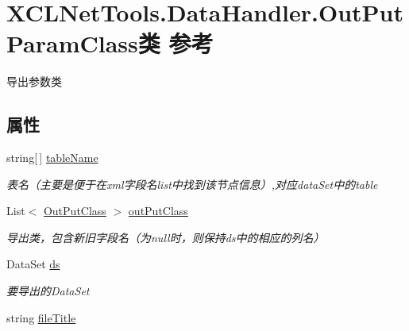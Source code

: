 \hypertarget{class_x_c_l_net_tools_1_1_data_handler_1_1_out_put_param_class}{\section{X\-C\-L\-Net\-Tools.\-Data\-Handler.\-Out\-Put\-Param\-Class类 参考}
\label{class_x_c_l_net_tools_1_1_data_handler_1_1_out_put_param_class}
}


导出参数类  


\subsection*{属性}
\begin{DoxyCompactItemize}
\item 
string\mbox{[}$\,$\mbox{]} \hyperlink{class_x_c_l_net_tools_1_1_data_handler_1_1_out_put_param_class_a7da1f957b459cb7fa6e6adcdbdaec714}{table\-Name}
\begin{DoxyCompactList}\small\item\em 表名（主要是便于在xml字段名list中找到该节点信息）,对应data\-Set中的table \end{DoxyCompactList}\item 
List$<$ \hyperlink{class_x_c_l_net_tools_1_1_data_handler_1_1_out_put_class}{Out\-Put\-Class} $>$ \hyperlink{class_x_c_l_net_tools_1_1_data_handler_1_1_out_put_param_class_a4288510d1df7a0d061c8cc846c3db900}{out\-Put\-Class}
\begin{DoxyCompactList}\small\item\em 导出类，包含新旧字段名（为null时，则保持ds中的相应的列名） \end{DoxyCompactList}\item 
Data\-Set \hyperlink{class_x_c_l_net_tools_1_1_data_handler_1_1_out_put_param_class_afc1f9f832db877b449642cdc1c2f3633}{ds}
\begin{DoxyCompactList}\small\item\em 要导出的\-Data\-Set \end{DoxyCompactList}\item 
string \hyperlink{class_x_c_l_net_tools_1_1_data_handler_1_1_out_put_param_class_a4aae8fc606fdb858e28601aa549d5a60}{file\-Title}

\end{DoxyCompactItemize}
